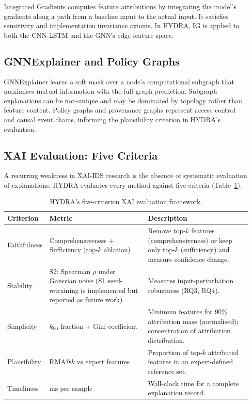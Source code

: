 \documentclass[12pt,a4paper]{report}
\begin{document}
Integrated Gradients \cite{sundararajan2017} computes feature attributions by integrating the model's gradients along a path from a baseline input to the actual input. It satisfies sensitivity and implementation invariance axioms. In HYDRA, IG is applied to both the CNN-LSTM and the GNN's edge feature space.

\subsection{GNNExplainer and Policy Graphs}
\label{sec:gnnexplainer}

GNNExplainer \cite{ying2019} learns a soft mask over a node's computational subgraph that maximises mutual information with the full-graph prediction. Subgraph explanations can be non-unique and may be dominated by topology rather than feature content. Policy graphs \cite{alves2017} and provenance graphs \cite{fang2022} represent access control and causal event chains, informing the plausibility criterion in HYDRA's evaluation.

\subsection{XAI Evaluation: Five Criteria}
\label{sec:xai-eval}

A recurring weakness in XAI-IDS research is the absence of systematic evaluation of explanations. HYDRA evaluates every method against five criteria (Table~\ref{tab:five-criteria}).

\begin{table}[H]
\centering
\caption{HYDRA's five-criterion XAI evaluation framework.}
\label{tab:five-criteria}
\small
\begin{tabularx}{\textwidth}{lp{3.5cm}X}
\toprule
\textbf{Criterion} & \textbf{Metric} & \textbf{Description} \\
\midrule
Faithfulness & Comprehensiveness + Sufficiency (top-$k$ ablation) & Remove top-$k$ features (comprehensiveness) or keep only top-$k$ (sufficiency) and measure confidence change. \\
\addlinespace
Stability & S2: Spearman $\rho$ under Gaussian noise (S1 seed-retraining is implemented but reported as future work) & Measures input-perturbation robustness (RQ3, RQ4). \\
\addlinespace
Simplicity & $k_{90}$ fraction + Gini coefficient & Minimum features for 90\% attribution mass (normalised); concentration of attribution distribution. \\
\addlinespace
Plausibility & RMA@$k$ vs expert features & Proportion of top-$k$ attributed features in an expert-defined reference set. \\
\addlinespace
Timeliness & ms per sample & Wall-clock time for a complete explanation record. \\
\bottomrule
\end{tabularx}
\end{table}
\end{document}

